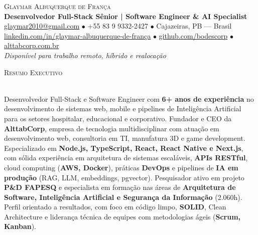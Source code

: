 \documentclass[a4paper]{article}
\newcommand{\lineunder}{
    \vspace*{-8pt} \\
    \hspace*{-18pt} \hrulefill \\
}
\newcommand{\header}[1]{
    {\hspace*{-18pt}\vspace*{6pt} \textsc{#1}}
    \vspace*{-6pt} \lineunder
}
\begin{document}
\vspace*{-40pt}

\begin{center}
    {\Huge \scshape {Glaymar Albuquerque de França}}\\
    \vspace*{4pt}
    {\large \textbf{Desenvolvedor Full-Stack Sênior | Software Engineer \& AI Specialist}}\\
    \vspace*{4pt}
    \href{mailto:glaymar2010@gmail.com}{glaymar2010@gmail.com}
    $\bullet$ +55 83 9 9332-2427
    $\bullet$ Cajazeiras, PB — Brasil\\
    \vspace*{2pt}
    \href{https://linkedin.com/in/glaymar-albuquerque-de-fran\%C3\%A7a}{linkedin.com/in/glaymar-albuquerque-de-frança}
    $\bullet$ \href{https://github.com/bodescorp}{github.com/bodescorp}
    $\bullet$ \href{https://alttabcorp.com.br}{alttabcorp.com.br}\\
    \vspace*{3pt}
    \textit{Disponível para trabalho remoto, híbrido e realocação}
\end{center}

\header{Resumo Executivo}
\vspace{2mm}

Desenvolvedor Full-Stack e Software Engineer com \textbf{6+ anos de experi\^{e}ncia}
no desenvolvimento de sistemas web, mobile e pipelines de Intelig\^{e}ncia Artificial para os setores
hospitalar, educacional e corporativo.
Fundador e CEO da \textbf{AlttabCorp}, empresa de tecnologia multidisciplinar com atua\c{c}\~{a}o em
desenvolvimento web, consultoria em TI, manufatura 3D e game development.
Especializado em \textbf{Node.js, TypeScript, React, React Native e Next.js}, com s\'{o}lida experi\^{e}ncia
em arquitetura de sistemas escal\'{a}veis, \textbf{APIs RESTful}, cloud computing (\textbf{AWS, Docker}),
pr\'{a}ticas \textbf{DevOps} e pipelines de \textbf{IA em produ\c{c}\~{a}o} (RAG, LLM, embeddings, pgvector).
Pesquisador ativo em projeto \textbf{P\&D FAPESQ} e especialista em forma\c{c}\~{a}o nas \'{a}reas de
\textbf{Arquitetura de Software, Intelig\^{e}ncia Artificial e Seguran\c{c}a da Informa\c{c}\~{a}o} (2.060h).
Perfil orientado a resultados, com foco em c\'{o}digo limpo, \textbf{SOLID}, Clean Architecture e
lideran\c{c}a t\'{e}cnica de equipes com metodologias \'{a}geis (\textbf{Scrum, Kanban}).

\vspace{3mm}
\end{document}
